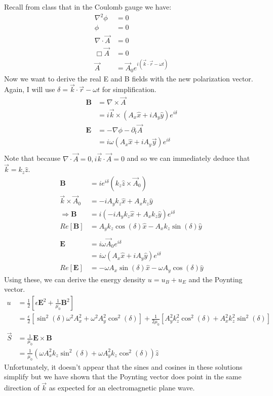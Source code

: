 \documentclass[a4paper, 11pt]{article}
\begin{document}
Recall from class that in the Coulomb gauge we have: 
	\begin{align*}
		\nabla^2\phi &= 0 \\
		\phi &= 0 \\ 
		\nabla \cdot \vec{A} &= 0 \\ 
		\Box \vec{A} &= 0 \\ 
		\vec{A} &= \vec{A}_0e^{i(\vec{k}\cdot\vec{r}-\omega t)}
	\end{align*}
Now we want to derive the real E and B fields with the new polarization vector. Again, I will use $\delta = \vec{k}\cdot\vec{r}-\omega t$ for simplification.  
	\begin{align*}
		\mathbf{B} 	&= \nabla \times \vec{A} \\ 
					&= i\vec{k}\times(A_x\hat{x}+iA_y\hat{y})e^{i\delta} \\ 
		\mathbf{E} 	&= -\nabla \phi - \partial_t \vec{A} \\ 
					&= i\omega(A_x\hat{x}+iA_y\vec{y})e^{i\delta} \\ 
	\end{align*}	
Note that because $\nabla \cdot \vec{A}=0, i\vec{k}\cdot\vec{A} =0$ and so we can immediately deduce that $\vec{k} = k_z\hat{z}$.
	\begin{align*}
		\mathbf{B} &= ie^{i\delta}(k_z\hat{z}\times\vec{A}_0) \\ 
		\vec{k}\times\vec{A}_0 &= -iA_yk_z\hat{x} + A_xk_z\hat{y} \\ 
		\Rightarrow\mathbf{B} &= i(-iA_yk_z\hat{x} + A_xk_z\hat{y})e^{i\delta} \\ 
		Re[\mathbf{B}] &= A_yk_z\cos(\delta)\hat{x}-A_xk_z\sin(\delta)\hat{y} \\ 
		\\
		\mathbf{E} 	&= i\omega \vec{A}_0e^{i\delta} \\ 
					&= i\omega (A_x\hat{x} + iA_y\hat{y})e^{i\delta} \\ 
		Re[\mathbf{E}] &= -\omega A_x\sin(\delta)\hat{x} - \omega A_y \cos(\delta)\hat{y} 
	\end{align*}
Using these, we can derive the energy density $u = u_B + u_E$ and the Poynting vector. 
	\begin{align*}
		u 	&= \frac{1}{2}[\epsilon\mathbf{E}^2+\frac{1}{\mu_0}\mathbf{B}^2] \\ 
			&= \frac{\epsilon}{2}[\sin^2(\delta)\omega^2A_x^2+\omega^2 A_y^2\cos^2(\delta)] + \frac{1}{2\mu_0}[A_y^2k_z^2\cos^2(\delta)+A_x^2k_z^2\sin^2(\delta)]	\\ 
			\\
		\vec{S} &= \frac{1}{\mu_0}\mathbf{E}\times\mathbf{B} \\ 
				&= \frac{1}{\mu_0}(\omega A_x^2k_z\sin^2(\delta)+\omega A_y^2k_z\cos^2(\delta))\hat{z} 
	\end{align*}
Unfortunately, it doesn't appear that the sines and cosines in these solutions simplify but we have shown that the Poynting vector does point in the same direction of $\vec{k}$ as expected for an electromagnetic plane wave. 
	
	
	
	
	
	
	
	
	
	
	
	
	
	
	
\end{document}
